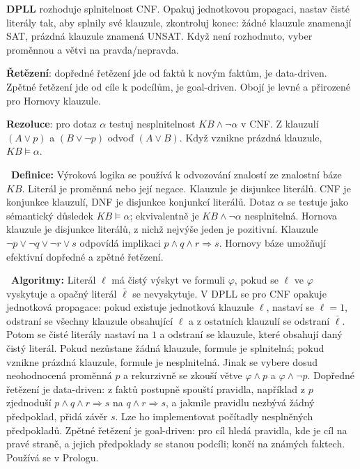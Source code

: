 \textbf{DPLL} rozhoduje splnitelnost CNF. Opakuj jednotkovou propagaci, nastav čisté literály tak, aby splnily své klauzule, zkontroluj konec: žádné klauzule znamenají SAT, prázdná klauzule znamená UNSAT. Když není rozhodnuto, vyber proměnnou a větvi na pravda/nepravda.

\textbf{Řetězení}: dopředné řetězení jde od faktů k novým faktům, je data-driven. Zpětné řetězení jde od cíle k podcílům, je goal-driven. Obojí je levné a přirozené pro Hornovy klauzule.

\textbf{Rezoluce}: pro dotaz $\alpha$ testuj nesplnitelnost $KB\land\neg\alpha$ v CNF. Z klauzulí $(A\lor p)$ a $(B\lor\neg p)$ odvoď $(A\lor B)$. Když vznikne prázdná klauzule, $KB\models\alpha$.

\begin{odpoved}
\setlength{\parskip}{2pt}
\noindent{}\ \textbf{Definice:} Výroková logika se používá k odvozování znalostí ze znalostní báze $KB$. Literál je proměnná nebo její negace. Klauzule je disjunkce literálů. CNF je konjunkce klauzulí, DNF je disjunkce konjunkcí literálů. Dotaz $\alpha$ se testuje jako sémantický důsledek $KB\models\alpha$; ekvivalentně je $KB\land\neg\alpha$ nesplnitelná. Hornova klauzule je disjunkce literálů, z nichž nejvýše jeden je pozitivní. Klauzule $\neg p\lor\neg q\lor\neg r\lor s$ odpovídá implikaci $p\land q\land r\Rightarrow s$. Hornovy báze umožňují efektivní dopředné a zpětné řetězení.\par
\noindent{}\ \textbf{Algoritmy:} Literál $\ell$ má čistý výskyt ve formuli $\varphi$, pokud se $\ell$ ve $\varphi$ vyskytuje a opačný literál $\bar\ell$ se nevyskytuje. V DPLL se pro CNF opakuje jednotková propagace: pokud existuje jednotková klauzule $\ell$, nastaví se $\ell=1$, odstraní se všechny klauzule obsahující $\ell$ a z ostatních klauzulí se odstraní $\bar\ell$. Potom se čisté literály nastaví na $1$ a odstraní se klauzule, které obsahují daný čistý literál. Pokud nezůstane žádná klauzule, formule je splnitelná; pokud vznikne prázdná klauzule, formule je nesplnitelná. Jinak se vybere dosud neohodnocená proměnná $p$ a rekurzivně se zkouší větve $\varphi\land p$ a $\varphi\land\neg p$. Dopředné řetězení je data-driven: z faktů postupně spouští pravidla, například z $p$ zjednoduší $p\land q\land r\Rightarrow s$ na $q\land r\Rightarrow s$, a jakmile pravidlu nezbývá žádný předpoklad, přidá závěr $s$. Lze ho implementovat počítadly nesplněných předpokladů. Zpětné řetězení je goal-driven: pro cíl hledá pravidla, kde je cíl na pravé straně, a jejich předpoklady se stanou podcíli; končí na známých faktech. Používá se v Prologu.\par

\end{odpoved}
